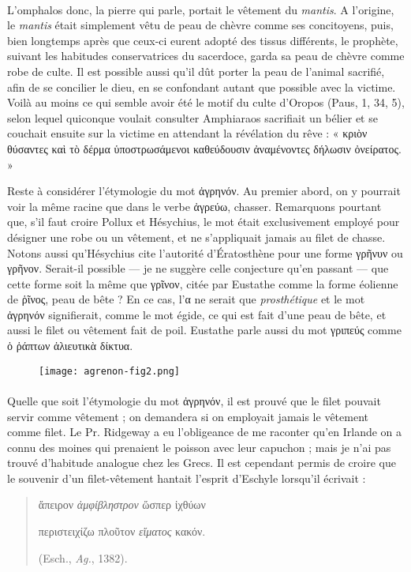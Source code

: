 \documentclass[a4paper, 11pt, oneside, polutonikogreek, french]{article}
\begin{document}
\paragraph{}
L'omphalos donc, la pierre qui parle, portait le vêtement du \emph{mantis}. A l'origine, le \emph{mantis} était simplement vêtu de peau de chèvre comme ses concitoyens, puis, bien longtemps après que ceux-ci eurent adopté des tissus différents, le prophète, suivant les habitudes conservatrices du sacerdoce, garda sa peau de chèvre comme robe de culte. Il est possible aussi qu'il dût porter la peau de l'animal sacrifié, afin de se concilier le dieu, en se confondant autant que possible avec la victime. Voilà au moins ce qui semble avoir été le motif du culte d'Oropos (Paus, 1, 34, 5), selon lequel quiconque voulait consulter Amphiaraos sacrifiait un bélier et se couchait ensuite sur la victime en attendant la révélation du rêve : « κριὸν θύσαντες καὶ τὸ δέρμα ὑποστρωσάμενοι καθεύδουσιν ἀναμένοντες δήλωσιν ὀνείρατος. »

Reste à considérer l'étymologie du mot ἀγρηνόν. Au premier abord, on y pourrait voir la même racine que dans le verbe ἀγρεύω, chasser. Remarquons pourtant que, s'il faut croire Pollux et Hésychius, le mot était exclusivement employé pour désigner une robe ou un vêtement, et ne s'appliquait jamais au filet de chasse. Notons aussi qu'Hésychius cite l'autorité d'Ératosthène pour une forme γρῆνυν ou γρῆνον. Serait-il possible --- je ne suggère celle conjecture qu'en passant --- que cette forme soit la même que γρῖνον, citée par Eustathe comme la forme éolienne de ῥῖνος, peau de bête ? En ce cas, l'α ne serait que \emph{prosthétique} et le mot ἀγρηνόν signifierait, comme le mot égide, ce qui est fait d'une peau de bête, et aussi le filet ou vêtement fait de poil. Eustathe parle aussi du mot γριπεύς comme ὁ ῥάπτων ἁλιευτικὰ δίκτυα.

\begin{figure}[ht]
\centering
\texttt{[image: agrenon-fig2.png]}
\end{figure}
\paragraph{}
Quelle que soit l'étymologie du mot ἀγρηνόν, il est prouvé que le filet pouvait servir comme vêtement ; on demandera si on employait jamais le vêtement comme filet. Le Pr. Ridgeway a eu l'obligeance de me raconter qu'en Irlande on a connu des moines qui prenaient le poisson avec leur capuchon ; mais je n'ai pas trouvé d'habitude analogue chez les Grecs. Il est cependant permis de croire que le souvenir d'un filet-vêtement hantait l'esprit d'Eschyle lorsqu'il écrivait :
\begin{quotation}
ἄπειρον \emph{ἀμφίβληστρον} ὥσπερ ἰχθύων
    
περιστειχίζω πλοῦτον \emph{εἴματος} κακόν.

(Esch., \emph{Ag.}, 1382).
\end{quotation}
\end{document}
